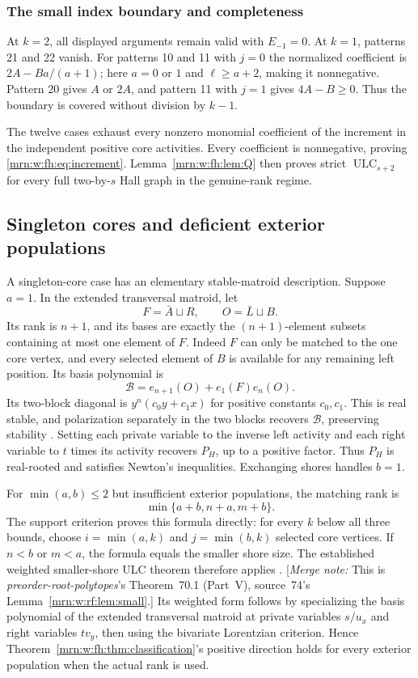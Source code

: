 \documentclass[11pt,a4paper]{article}
\theoremstyle{remark}\newtheorem{remark}[theorem]{Remark}
\newcommand{\ULC}{\operatorname{ULC}}      %
\newcommand{\mnote}[1]{[\textit{Merge note:} #1]}
\newcommand{\prp}{\emph{preorder-root-polytopes}}
\begin{document}
\subsubsection{The small index boundary and completeness}
At $k=2$, all displayed arguments remain valid with $E_{-1}=0$. At $k=1$, patterns 21 and 22 vanish. For patterns 10 and 11 with $j=0$ the normalized coefficient is $2A-Ba/(a+1)$; here $a=0$ or $1$ and $\ell\ge a+2$, making it nonnegative. Pattern 20 gives $A$ or $2A$, and pattern 11 with $j=1$ gives $4A-B\ge0$. Thus the boundary is covered without division by $k-1$.

The twelve cases exhaust every nonzero monomial coefficient of the increment in the independent positive core activities. Every coefficient is nonnegative, proving \eqref{mrn:w:fh:eq:increment}. Lemma~\ref{mrn:w:fh:lem:Q} then proves strict $\ULC_{s+2}$ for every full two-by-$s$ Hall graph in the genuine-rank regime.

\subsection{Singleton cores and deficient exterior populations}\label{mrn:w:fh:sec:small}
A singleton-core case has an elementary stable-matroid description. Suppose $a=1$. In the extended transversal matroid, let
\[
 F=\bar A\sqcup R,\qquad O=\bar L\sqcup B.
\]
Its rank is $n+1$, and its bases are exactly the $(n+1)$-element subsets containing at most one element of $F$. Indeed $F$ can only be matched to the one core vertex, and every selected element of $B$ is available for any remaining left position. Its basis polynomial is
\[
 \mathcal B=e_{n+1}(O)+e_1(F)e_n(O).
\]
Its two-block diagonal is $y^n(c_0y+c_1x)$ for positive constants $c_0,c_1$. This is real stable, and polarization separately in the two blocks recovers $\mathcal B$, preserving stability \cite{b:COSW}. Setting each private variable to the inverse left activity and each right variable to $t$ times its activity recovers $P_H$, up to a positive factor. Thus $P_H$ is real-rooted and satisfies Newton's inequalities. Exchanging shores handles $b=1$.

For $\min(a,b)\le2$ but insufficient exterior populations, the matching rank is
\[
 \min\{a+b,n+a,m+b\}.
\]
The support criterion proves this formula directly: for every $k$ below all three bounds, choose $i=\min(a,k)$ and $j=\min(b,k)$ selected core vertices. If $n<b$ or $m<a$, the formula equals the smaller shore size. The established weighted smaller-shore ULC theorem therefore applies \cite{b:RU,b:BH}. \mnote{This is \prp's Theorem~70.1 (Part~V), source~74's Lemma~\ref{mrn:w:rf:lem:small}.} Its weighted form follows by specializing the basis polynomial of the extended transversal matroid at private variables $s/u_x$ and right variables $tv_y$, then using the bivariate Lorentzian criterion. Hence Theorem~\ref{mrn:w:fh:thm:classification}'s positive direction holds for every exterior population when the actual rank is used.
\end{document}
